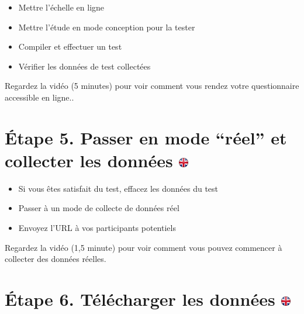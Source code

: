 \documentclass[
]{book}
\providecommand{\tightlist}{%
  \setlength{\itemsep}{0pt}\setlength{\parskip}{0pt}}
\begin{document}
\begin{itemize}
\tightlist
\item
  Mettre l'échelle en ligne
\item
  Mettre l'étude en mode conception pour la tester
\item
  Compiler et effectuer un test
\item
  Vérifier les données de test collectées
\end{itemize}

Regardez la vidéo (5 minutes) pour voir comment vous rendez votre questionnaire accessible en ligne..

\hypertarget{uxe9tape-5.-passer-en-mode-ruxe9el-et-collecter-les-donnuxe9es}{%
\section[Étape 5. Passer en mode ``réel'' et collecter les données ]{\texorpdfstring{Étape 5. Passer en mode ``réel'' et collecter les données \href{https://www.psytoolkit.org/lessons/questionnaire-project.html\#_step_5_switch_to_real_mode_and_collect_data}{\protect\includegraphics{img/ukflag.png}}}{Étape 5. Passer en mode ``réel'' et collecter les données }}\label{uxe9tape-5.-passer-en-mode-ruxe9el-et-collecter-les-donnuxe9es}}

\begin{itemize}
\tightlist
\item
  Si vous êtes satisfait du test, effacez les données du test
\item
  Passer à un mode de collecte de données réel
\item
  Envoyez l'URL à vos participants potentiels
\end{itemize}

Regardez la vidéo (1,5 minute) pour voir comment vous pouvez commencer à collecter des données réelles.

\hypertarget{uxe9tape-6.-tuxe9luxe9charger-les-donnuxe9es}{%
\section[Étape 6. Télécharger les données ]{\texorpdfstring{Étape 6. Télécharger les données \href{https://www.psytoolkit.org/lessons/questionnaire-project.html\#_step_6_download_data}{\protect\includegraphics{img/ukflag.png}}}{Étape 6. Télécharger les données }}\label{uxe9tape-6.-tuxe9luxe9charger-les-donnuxe9es}}
\end{document}
